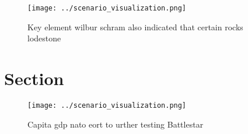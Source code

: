 \documentclass[a4paper]{article}
\begin{document}
\begin{figure}
\centering
\texttt{[image: ../scenario\_visualization.png]}
\caption{Key element wilbur schram also indicated that certain rocks lodestone
}
\end{figure}
 
\section{Section}

\begin{figure}
\centering
\texttt{[image: ../scenario\_visualization.png]}
\caption{Capita gdp nato eort to urther testing Battlestar
}
\end{figure}
 
\end{document}
